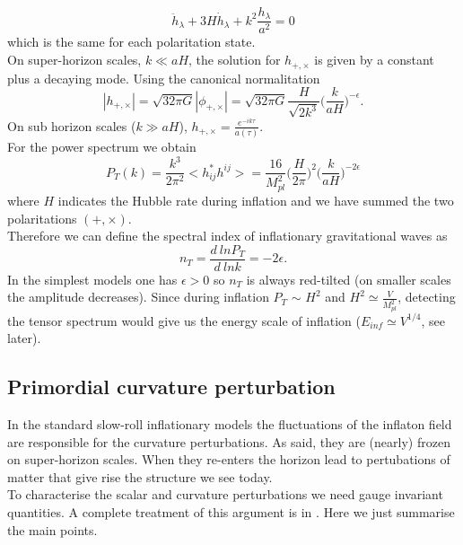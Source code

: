\documentclass[11pt,a4paper,twoside]{book}
\begin{document}
\begin{equation}
	\ddot{h}_{\lambda} + 3H\dot{h}_{\lambda}+ k^{2}\frac{h_{\lambda}}{a^{2}}=0
\end{equation}
which is the same for each polaritation state.\\
On super-horizon scales, $ k\ll aH $, the solution for $ h_{+,\times} $ is given by a constant plus a decaying mode. Using the canonical normalitation
\begin{equation}
|h_{+,\times}|= \sqrt{32\pi G}|\phi_{+,\times}| = \sqrt{32\pi G} \frac{H}{\sqrt{2k^{3}}}\Big (\frac{k}{aH}\Big)^{-\epsilon}.
\end{equation}
On sub horizon scales ($ k \gg aH $), $ h_{+,\times}=\frac{e^{-ik\tau}}{a(\tau)} $.\\
For the power spectrum we obtain
\begin{equation}
\label{spectumGW}
P_{T}(k)=\frac{k^{3}}{2\pi^{2}}<h^{*}_{ij}h^{ij}>=\frac{16}{M_{pl}^{2}}\Big(\frac{H}{2\pi}\Big )^{2}\Big (\frac{k}{aH}\Big)^{-2\epsilon}
\end{equation}   
where $ H $ indicates the Hubble rate during inflation and we have summed the two polaritations $ (+,\times) $.\\
Therefore we can define the spectral index of inflationary gravitational waves as
\begin{equation}
n_{T} = \frac{d\ ln P_{T}}{d\ ln k} = -2\epsilon.
\end{equation}
In the simplest models one has $ \epsilon > 0 $ so $ n_{T} $ is always red-tilted (on smaller scales the amplitude decreases).
Since during inflation $P_{T} $ $\sim$ $ H^{2} $ and $ H^{2} \simeq \frac{V}{M^{2}_{pl}} $, detecting the tensor spectrum would give us the energy scale of inflation ($ E_{inf} \simeq V^{1/4} $, see later). 

\subsection{Primordial curvature perturbation}
In the standard slow-roll inflationary models the fluctuations of the inflaton field are responsible for the curvature perturbations.
 As said, they are (nearly) frozen on super-horizon scales. When they re-enters the horizon lead to pertubations of matter that give rise the structure we see today.\\
To characterise the scalar and curvature perturbations we need gauge invariant quantities.
A complete treatment of this argument is in \cite{NonGauss:Intro}. Here we just summarise the main points.
\end{document}
